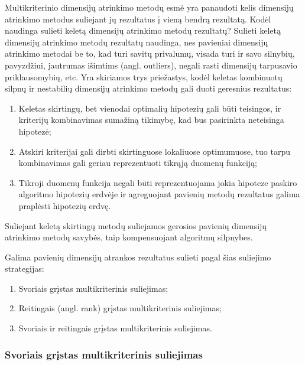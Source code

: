 Multikriterinio dimensijų atrinkimo metodų esmė yra panaudoti
kelis dimensijų atrinkimo metodus suliejant jų
rezultatus į vieną bendrą rezultatą. Kodėl naudinga sulieti keletą dimensijų
atrinkimo metodų rezultatų? Sulieti keletą dimensijų atrinkimo metodų rezultatų
naudinga, nes
pavieniai dimensijų atrinkimo metodai be to, kad turi savitų privalumų, visada
turi ir savo silnybių, pavyzdžiui, jautrumas išimtims (angl. outliers), negali
rasti dimensijų tarpusavio priklausomybių, etc. Yra skiriamos trys priežastys,
kodėl keletas kombinuotų silpnų ir nestabilių dimensijų atrinkimo metodų
gali duoti geresnius rezultatus\cite{dietterich2000ensemble}:
\begin{enumerate}
 \item Keletas skirtingų, bet vienodai optimalių hipotezių gali būti teisingos,
 ir kriterijų kombinavimas sumažiną tikimybę, kad bus pasirinkta neteisinga 
 hipotezė;
 \item Atskiri kriterijai gali dirbti skirtinguose lokaliuose optimumuose, tuo
 tarpu kombinavimas gali geriau reprezentuoti tikrąją duomenų funkciją;
 \item Tikroji duomenų funkcija negali būti reprezentuojama jokia hipoteze
 paskiro algoritmo hipotezių erdvėje ir agreguojant pavienių metodų rezultatus
 galima praplėsti hipotezių erdvę.
\end{enumerate}
Suliejant keletą skirtingų metodų
suliejamos gerosios pavienių dimensijų atrinkimo metodų savybės, taip
kompensuojant algoritmų silpnybes.

Galima pavienių dimensijų atrankos rezultatus sulieti pagal šias suliejimo
strategijas:
\begin{enumerate}
  \item Svoriais grįstas multikriterinis suliejimas;
  \item Reitingais (angl. rank) grįstas multikriterinis suliejimas;
  \item Svoriais ir reitingais grįstas multikriterinis suliejimas.
\end{enumerate}

\subsubsection{Svoriais grįstas multikriterinis suliejimas}

